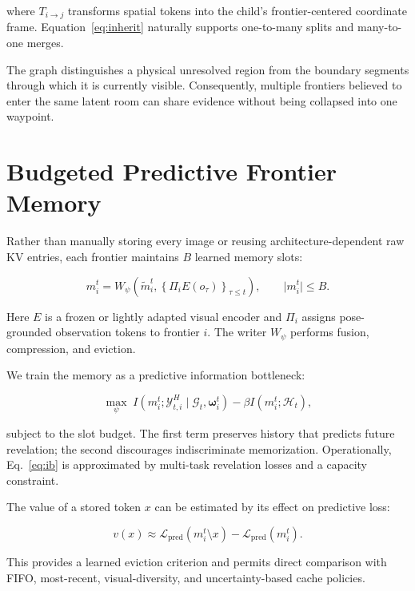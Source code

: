 \documentclass[10pt,twocolumn]{article}
\newcommand{\History}{\mathcal{H}}
\newcommand{\Global}{\mathcal{G}}
\newcommand{\Reveal}{\mathcal{Y}}
\newcommand{\Option}{\boldsymbol{\omega}}
\newcommand{\Loss}{\mathcal{L}}
\begin{document}
where \(T_{i\rightarrow j}\) transforms spatial tokens into the child's
frontier-centered coordinate frame. Equation~\eqref{eq:inherit} naturally
supports one-to-many splits and many-to-one merges.

The graph distinguishes a physical unresolved region from the boundary
segments through which it is currently visible. Consequently, multiple
frontiers believed to enter the same latent room can share evidence without
being collapsed into one waypoint.

\section{Budgeted Predictive Frontier Memory}

Rather than manually storing every image or reusing architecture-dependent raw
KV entries, each frontier maintains \(B\) learned memory slots:

\begin{equation}
m_i^t =
W_{\psi}
\left(
\widetilde m_i^t,
\left\{
\Pi_i E(o_\tau)
\right\}_{\tau\leq t}
\right),
\qquad
\lvert m_i^t\rvert\leq B.
\end{equation}

Here \(E\) is a frozen or lightly adapted visual encoder and \(\Pi_i\) assigns
pose-grounded observation tokens to frontier \(i\). The writer
\(W_\psi\) performs fusion, compression, and eviction.

We train the memory as a predictive information bottleneck:

\begin{equation}
\max_{\psi}
\;
I
\left(
m_i^t;\Reveal_{t,i}^{H}
\mid
\Global_t,\Option_i^t
\right)
-
\beta
I
\left(
m_i^t;\History_t
\right),
\label{eq:ib}
\end{equation}

subject to the slot budget. The first term preserves history that predicts
future revelation; the second discourages indiscriminate memorization.
Operationally, Eq.~\eqref{eq:ib} is approximated by multi-task revelation
losses and a capacity constraint.

The value of a stored token \(x\) can be estimated by its effect on predictive
loss:

\begin{equation}
v(x)
\approx
\Loss_{\mathrm{pred}}
\left(m_i^t\setminus x\right)
-
\Loss_{\mathrm{pred}}
\left(m_i^t\right).
\end{equation}

This provides a learned eviction criterion and permits direct comparison with
FIFO, most-recent, visual-diversity, and uncertainty-based cache policies.
\end{document}
